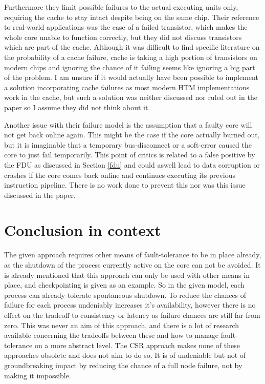 \documentclass[a4paper,10pt,twoside]{article}
\begin{document}
Furthermore they limit possible failures to the actual executing units only, requiring the cache to stay intact despite being on the same chip. Their reference to real-world applications was the case of a failed transistor, which makes the whole core unable to function correctly, but they did not discuss transistors which are part of the cache. Although it was difficult to find specific literature on the probability of a cache failure, cache is taking a high portion of transistors on modern chips and ignoring the chance of it failing seems like ignoring a big part of the problem. I am unsure if it would actually have been possible to implement a solution incorporating cache failures as most modern HTM implementations work in the cache, but such a solution was neither discussed nor ruled out in the paper so I assume they did not think about it. 

Another issue with their failure model is the assumption that a faulty core will not get back online again. This might be the case if the core actually burned out, but it is imaginable that a temporary bus-disconnect or a soft-error caused the core to just fail temporarily. This point of critics is related to a false positive by the FDU as discussed in Section \ref{fdu} and could aswell lead to data corruption or crashes if the core comes back online and continues executing its previous instruction pipeline. There is no work done to prevent this nor was this issue discussed in the paper.

\section{Conclusion in context}

The given approach requires other means of fault-tolerance to be in place already, as the shutdown of the process currently active on the core can not be avoided. It is already mentioned that this approach can only be used with other means in place, and checkpointing is given as an example. So in the given model, each process can already tolerate spontaneous shutdown. To reduce the chances of failure for each process undeniably increases it's availability, however there is no effect on the tradeoff to consistency or latency as failure chances are still far from zero. This was never an aim of this approach, and there is a lot of research available concerning the tradeoffs between these and how to manage fault-tolerance on a more abstract level. The CSR approach makes none of these approaches obsolete and does not aim to do so. It is of undeniable but not of groundbreaking impact by reducing the chance of a full node failure, not by making it impossible.
\end{document}
